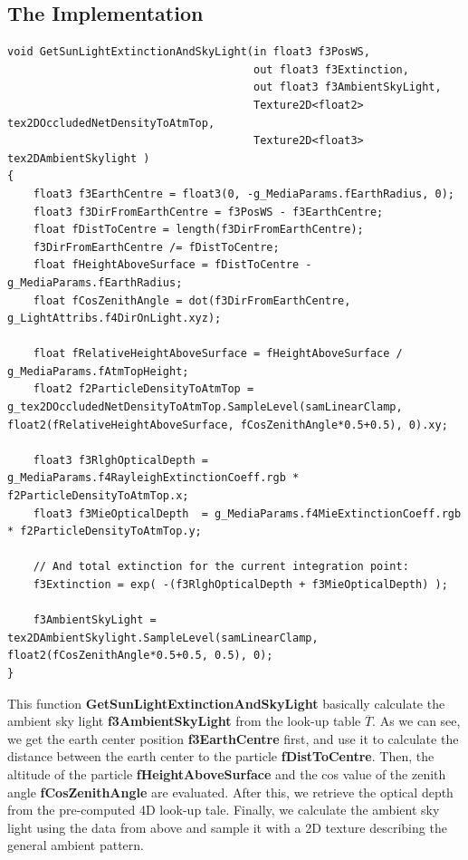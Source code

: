 \subsection{The Implementation}
\begin{lstlisting}
void GetSunLightExtinctionAndSkyLight(in float3 f3PosWS,
                                      out float3 f3Extinction,
                                      out float3 f3AmbientSkyLight,
                                      Texture2D<float2> tex2DOccludedNetDensityToAtmTop,
                                      Texture2D<float3> tex2DAmbientSkylight )
{
    float3 f3EarthCentre = float3(0, -g_MediaParams.fEarthRadius, 0);
    float3 f3DirFromEarthCentre = f3PosWS - f3EarthCentre;
    float fDistToCentre = length(f3DirFromEarthCentre);
    f3DirFromEarthCentre /= fDistToCentre;
    float fHeightAboveSurface = fDistToCentre - g_MediaParams.fEarthRadius;
    float fCosZenithAngle = dot(f3DirFromEarthCentre, g_LightAttribs.f4DirOnLight.xyz);

    float fRelativeHeightAboveSurface = fHeightAboveSurface / g_MediaParams.fAtmTopHeight;
    float2 f2ParticleDensityToAtmTop = g_tex2DOccludedNetDensityToAtmTop.SampleLevel(samLinearClamp, float2(fRelativeHeightAboveSurface, fCosZenithAngle*0.5+0.5), 0).xy;
    
    float3 f3RlghOpticalDepth = g_MediaParams.f4RayleighExtinctionCoeff.rgb * f2ParticleDensityToAtmTop.x;
    float3 f3MieOpticalDepth  = g_MediaParams.f4MieExtinctionCoeff.rgb      * f2ParticleDensityToAtmTop.y;
        
    // And total extinction for the current integration point:
    f3Extinction = exp( -(f3RlghOpticalDepth + f3MieOpticalDepth) );
    
    f3AmbientSkyLight = tex2DAmbientSkylight.SampleLevel(samLinearClamp, float2(fCosZenithAngle*0.5+0.5, 0.5), 0);
}
\end{lstlisting}
This function \textbf{GetSunLightExtinctionAndSkyLight} basically calculate the ambient sky light \textbf{f3AmbientSkyLight} from the look-up table $\overline{T}$. As we can see, we get the earth center position \textbf{f3EarthCentre} first, and use it to calculate the distance between the earth center to the particle \textbf{fDistToCentre}. Then, the altitude of the particle \textbf{fHeightAboveSurface} and the cos value of the zenith angle \textbf{fCosZenithAngle} are evaluated. After this, we retrieve the optical depth from the pre-computed 4D look-up tale. Finally, we calculate the ambient sky light using the data from above and sample it with a 2D texture describing the general ambient pattern.

